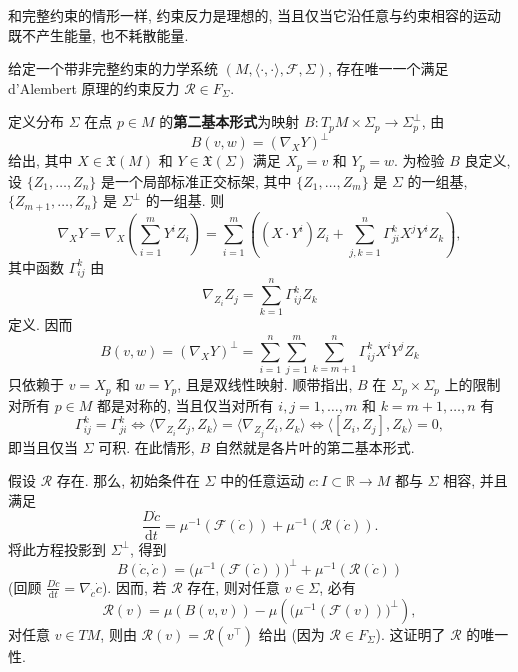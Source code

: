 和完整约束的情形一样, 约束反力是理想的, 当且仅当它沿任意与约束相容的运动既不产生能量, 也不耗散能量.

\begin{RiemannTheorem}\label{thm:perfect-reaction-force-for-nonholonomic-constraint}
给定一个带非完整约束的力学系统 $(M,\langle\cdot,\cdot\rangle,\mathcal{F},\Sigma)$, 存在唯一一个满足 d’Alembert 原理的约束反力 $\mathcal{R}\in F_\Sigma$.
\end{RiemannTheorem}

\begin{RiemannProof}
定义分布 $\Sigma$ 在点 $p\in M$ 的\textbf{第二基本形式}为映射 $B:T_pM\times\Sigma_p\to\Sigma_p^\perp$, 由
\[
  B(v,w)=(\nabla_XY)^\perp
\]
给出, 其中 $X\in\mathfrak{X}(M)$ 和 $Y\in\mathfrak{X}(\Sigma)$ 满足 $X_p=v$ 和 $Y_p=w$. 为检验 $B$ 良定义, 设 $\{Z_1,\ldots,Z_n\}$ 是一个局部标准正交标架, 其中 $\{Z_1,\ldots,Z_m\}$ 是 $\Sigma$ 的一组基, $\{Z_{m+1},\ldots,Z_n\}$ 是 $\Sigma^\perp$ 的一组基. 则
\[
  \nabla_XY=\nabla_X\left(\sum_{i=1}^m Y^iZ_i\right)
  =\sum_{i=1}^m\left((X\cdot Y^i)Z_i+\sum_{j,k=1}^n\Gamma_{ji}^kX^jY^i Z_k\right),
\]
其中函数 $\Gamma_{ij}^k$ 由
\[
  \nabla_{Z_i}Z_j=\sum_{k=1}^n\Gamma_{ij}^kZ_k
\]
定义. 因而
\[
  B(v,w)=(\nabla_XY)^\perp
  =\sum_{i=1}^n\sum_{j=1}^m\sum_{k=m+1}^n\Gamma_{ij}^kX^iY^jZ_k
\]
只依赖于 $v=X_p$ 和 $w=Y_p$, 且是双线性映射. 顺带指出, $B$ 在 $\Sigma_p\times\Sigma_p$ 上的限制对所有 $p\in M$ 都是对称的, 当且仅当对所有 $i,j=1,\ldots,m$ 和 $k=m+1,\ldots,n$ 有
\[
  \Gamma_{ij}^k=\Gamma_{ji}^k
  \iff \langle\nabla_{Z_i}Z_j,Z_k\rangle=\langle\nabla_{Z_j}Z_i,Z_k\rangle
  \iff \langle[Z_i,Z_j],Z_k\rangle=0,
\]
即当且仅当 $\Sigma$ 可积. 在此情形, $B$ 自然就是各片叶的第二基本形式.

假设 $\mathcal{R}$ 存在. 那么, 初始条件在 $\Sigma$ 中的任意运动 $c:I\subset\mathbb{R}\to M$ 都与 $\Sigma$ 相容, 并且满足
\[
  \frac{D\dot c}{\mathrm{d}t}=\mu^{-1}(\mathcal{F}(\dot c))+\mu^{-1}(\mathcal{R}(\dot c)).
\]
将此方程投影到 $\Sigma^\perp$, 得到
\[
  B(\dot c,\dot c)=\bigl(\mu^{-1}(\mathcal{F}(\dot c))\bigr)^\perp
  +\mu^{-1}(\mathcal{R}(\dot c))
\]
(回顾 $\frac{D\dot c}{\mathrm{d}t}=\nabla_{\dot c}\dot c$). 因而, 若 $\mathcal{R}$ 存在, 则对任意 $v\in\Sigma$, 必有
\[
  \mathcal{R}(v)=\mu(B(v,v))-\mu\left(\bigl(\mu^{-1}(\mathcal{F}(v))\bigr)^\perp\right),
\]
对任意 $v\in TM$, 则由 $\mathcal{R}(v)=\mathcal{R}(v^\top)$ 给出 (因为 $\mathcal{R}\in F_\Sigma$). 这证明了 $\mathcal{R}$ 的唯一性.


\end{RiemannProof}
